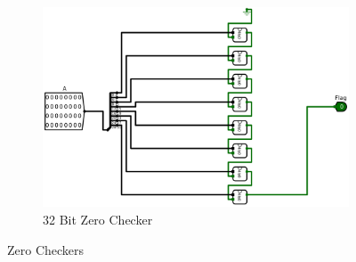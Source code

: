 \documentclass[12pt]{article}
\begin{document}
\begin{figure}[H]
\begin{subfigure}[b]{0.3\textwidth}
        \includegraphics[width=\textwidth]{Images/32Is0.png}
        \caption{32 Bit Zero Checker}
        \label{fig:32is0}
    \end{subfigure}
    \caption{Zero Checkers}\label{fig:zerocheck}
\end{figure}
\end{document}

